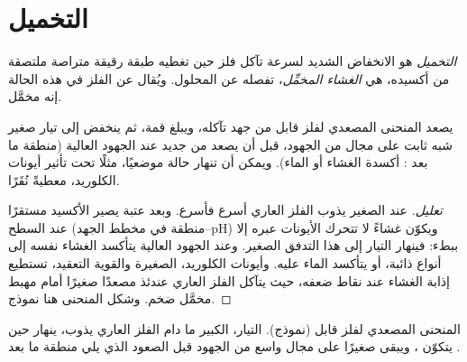 \section{التخميل}

\begin{definition}[التخميل]\label{def:b2:corrosion:passivation}
\emph{التخميل} هو الانخفاض الشديد لسرعة تآكل
فلز حين تغطيه طبقة رقيقة متراصة ملتصقة من
أكسيده، هي \emph{الغشاء المخمِّل}، تفصله عن
المحلول. ويُقال عن الفلز في هذه الحالة إنه مخمَّل.
\end{definition}

\begin{proposition}\label{prop:b2:corrosion:passivity}
يصعد المنحنى المصعدي لفلز قابل  من جهد تآكله،
ويبلغ قمة، ثم ينخفض إلى تيار  صغير شبه ثابت على
مجال من الجهود، قبل أن يصعد من جديد عند الجهود العالية (منطقة ما بعد
: أكسدة الغشاء أو الماء). ويمكن أن تنهار حالة 
موضعيًا، مثلًا تحت تأثير أيونات الكلوريد، معطيةً نُقَرًا.
\end{proposition}

\begin{proof}[تعليل]
عند  الصغير يذوب الفلز العاري أسرع فأسرع. وبعد
عتبة يصير الأكسيد مستقرًا عند السطح (منطقة  في
مخطط الجهد--pH) ويكوّن غشاءً لا تتحرك الأيونات عبره إلا ببطء: فينهار
التيار إلى هذا التدفق الصغير. وعند الجهود العالية يتأكسد الغشاء نفسه
إلى أنواع ذائبة، أو يتأكسد الماء عليه. وأيونات الكلوريد، الصغيرة
والقوية التعقيد، تستطيع إذابة الغشاء عند نقاط ضعفه، حيث يتآكل الفلز
العاري عندئذ مصعدًا صغيرًا أمام مهبط مخمَّل ضخم. وشكل
المنحنى هنا نموذج.
\end{proof}

\begin{omfigure}

{\small المنحنى المصعدي لفلز قابل  (نموذج). التيار، الكبير ما دام
الفلز العاري يذوب، ينهار حين يتكوّن ، ويبقى
صغيرًا على مجال واسع من الجهود قبل الصعود الذي يلي منطقة ما بعد .}
\end{omfigure}

